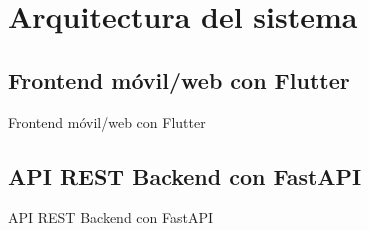 \section{Arquitectura del sistema}
    \subsection{Frontend móvil/web con Flutter}
        Frontend móvil/web con Flutter
    
    \subsection{API REST Backend con FastAPI}
        API REST Backend con FastAPI